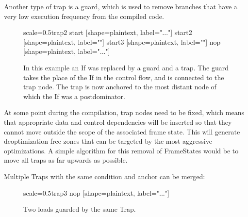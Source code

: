 \documentclass[twocolumn]{svjour3}
\begin{document}
Another type of trap is a guard, which is used to remove branches that have a very low execution frequency from the compiled code.

\begin{figure}[h]
  \label{fig:trap2}
  \centering
\begin{digraphenv}{scale=0.5}{trap2}
    start [shape=plaintext, label="..."]
    start2 [shape=plaintext, label=""]
    start3 [shape=plaintext, label=""]
    nop [shape=plaintext, label="..."]
\end{digraphenv}
  \caption{In this example an If was replaced by a guard and a trap.
The guard takes the place of the If in the control flow, and is connected to the trap node.
The trap is now anchored to the most distant node of which the If was a postdominator.}
\end{figure}

At some point during the compilation, trap nodes need to be fixed, which means that appropriate data and control dependencies will be inserted so that they cannot move outside the scope of the associated frame state.
This will generate deoptimization-free zones that can be targeted by the most aggressive optimizations.
A simple algorithm for this removal of FrameStates would be to move all traps as far upwards as possible.


Multiple Traps with the same condition and anchor can be merged:

\begin{figure}[h]
  \label{fig:trap3}
  \centering
\begin{digraphenv}{scale=0.5}{trap3}
    nop [shape=plaintext, label="..."]
\end{digraphenv}
  \caption{Two loads guarded by the same Trap.}
\end{figure}
\end{document}
